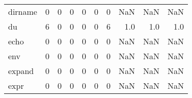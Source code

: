 \begin{tabular}{lrrrrrrrrr}
dirname   &                                       0 &                                                  0 &                                                  0 &                                                  0 &                                                  0 &                                                  0 &                                                NaN &                                    NaN &                                  NaN \\
du        &                                       6 &                                                  0 &                                                  0 &                                                  0 &                                                  0 &                                                  6 &                                                1.0 &                                    1.0 &                                  1.0 \\
echo      &                                       0 &                                                  0 &                                                  0 &                                                  0 &                                                  0 &                                                  0 &                                                NaN &                                    NaN &                                  NaN \\
env       &                                       0 &                                                  0 &                                                  0 &                                                  0 &                                                  0 &                                                  0 &                                                NaN &                                    NaN &                                  NaN \\
expand    &                                       0 &                                                  0 &                                                  0 &                                                  0 &                                                  0 &                                                  0 &                                                NaN &                                    NaN &                                  NaN \\
expr      &                                       0 &                                                  0 &                                                  0 &                                                  0 &                                                  0 &                                                  0 &                                                NaN &                                    NaN &                                  NaN \\

\end{tabular}
